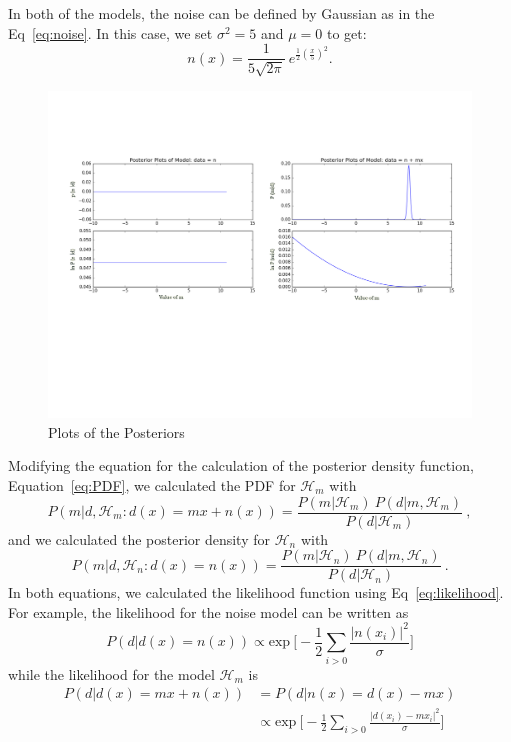 \documentclass{article}
\begin{document}
 In both of the models, the noise can be defined by Gaussian as in the Eq~\ref{eq:noise}. In this case, we set $\sigma ^ 2 = 5$ and $\mu = 0$ to get: 
 \begin{equation}\label{eq:noiseMX}
 n(x) = \frac{1}{5 \sqrt{2 \pi} } \ e^{\frac{1}{2} (\frac{x}{5})^2}.
 \end{equation}
 
 

\begin{figure}[h]
	\centering
	\includegraphics[width=1\textwidth]{Figures/exampleMXplot.pdf} 
	\caption{Plots of the Posteriors}
	\label{Fig:exampleMXplot}
\end{figure}
 
Modifying the equation for the calculation of the posterior density function, Equation~\ref{eq:PDF}, we calculated the PDF for $\mathcal{H}_{m}$ with 
\begin{equation} \label{eq:PDFforMX}
	P(m|d,\mathcal{H}_{m}:d(x) = mx + n(x))  = \frac{P(m| \mathcal{H}_{m}) \ P(d|m,  \mathcal{H}_{m})}  { P(d|\mathcal{H}_{m})} \ ,
\end{equation}
 and we calculated the posterior density for $\mathcal{H}_{n}$ with \begin{equation} \label{eq:PDFforMXnoise}
 P(m|d,\mathcal{H}_{n}:d(x) = n(x))  = \frac{P(m| \mathcal{H}_{n}) \ P(d|m,  \mathcal{H}_{n})}  { P(d|\mathcal{H}_{n})} \ .
 \end{equation} In both equations, we calculated the likelihood function using Eq~\ref{eq:likelihood}. For example, the likelihood for the noise model can be written as $$ P(d|d(x)=n(x)) \propto \text{exp} \ \bigg[ -\frac{1}{2} \sum_{i>0} \frac{| n(x_i)|^2}{\sigma}	\bigg]$$ 
 while the likelihood for the model $\mathcal{H}_{m}$ is  
 \begin{align*}
  P(d|d(x)=mx+n(x)) & = P(d|n(x)=d(x)-mx)\\
  &\propto \text{exp} \ \bigg[ -\frac{1}{2} \sum_{i>0} \frac{|d(x_i) - mx_i|^2}{\sigma}	\bigg]
 \end{align*}
\end{document}
